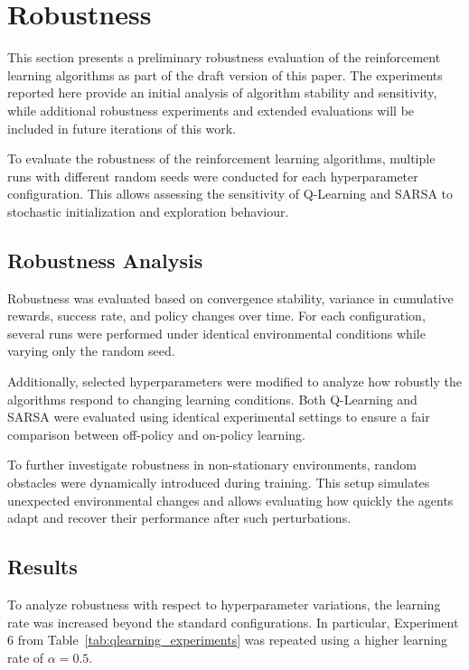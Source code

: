 \documentclass[a4paper,11pt]{article}
\theoremstyle{definition}
\begin{document}
\section{Robustness}

This section presents a preliminary robustness evaluation of the reinforcement learning algorithms as part of the draft version of this paper. The experiments reported here provide an initial analysis of algorithm stability and sensitivity, while additional robustness experiments and extended evaluations will be included in future iterations of this work.

To evaluate the robustness of the reinforcement learning algorithms, multiple runs with different random seeds were conducted for each hyperparameter configuration. This allows assessing the sensitivity of Q-Learning and SARSA to stochastic initialization and exploration behaviour.

\subsection{Robustness Analysis}

Robustness was evaluated based on convergence stability, variance in cumulative rewards, success rate, and policy changes over time. For each configuration, several runs were performed under identical environmental conditions while varying only the random seed.

Additionally, selected hyperparameters were modified to analyze how robustly the algorithms respond to changing learning conditions. Both Q-Learning and SARSA were evaluated using identical experimental settings to ensure a fair comparison between off-policy and on-policy learning.

To further investigate robustness in non-stationary environments, random obstacles were dynamically introduced during training. This setup simulates unexpected environmental changes and allows evaluating how quickly the agents adapt and recover their performance after such perturbations.

\subsection{Results}

To analyze robustness with respect to hyperparameter variations, the learning rate was increased beyond the standard configurations. In particular, Experiment 6 from Table~\ref{tab:qlearning_experiments} was repeated using a higher learning rate of $\alpha = 0.5$.
\end{document}
